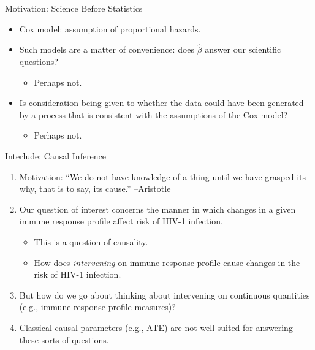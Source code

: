 \documentclass[12pt,t,handout]{beamer}
\begin{document}
\begin{frame}[c]{Motivation: Science Before Statistics}
\begin{center}
\begin{itemize}
  \itemsep10pt
  \item Cox model: assumption of proportional hazards.
  \item Such models are a matter of convenience: does $\hat{\beta}$ answer our
    scientific questions?
    \begin{itemize}
      \item Perhaps not.
    \end{itemize}
  \item Is consideration being given to whether the data could have been
    generated by a process that is consistent with the assumptions of the Cox
    model?
    \begin{itemize}
      \item Perhaps not.
    \end{itemize}
\end{itemize}
\end{center}

\note{
}
\end{frame}


\begin{frame}[c]{Interlude: Causal Inference}

\begin{center}
\begin{enumerate}
  \itemsep10pt
  \item Motivation: ``We do not have knowledge of a thing until we have grasped
    its why, that is to say, its cause.'' --Aristotle
  \item Our question of interest concerns the manner in which changes in a given
    immune response profile affect risk of HIV-1 infection.
    \begin{itemize}
      \item This is a question of causality.
      \item How does \textit{intervening} on immune response profile cause
        changes in the risk of HIV-1 infection.
    \end{itemize}
  \item But how do we go about thinking about intervening on continuous
    quantities (e.g., immune response profile measures)?
  \item Classical causal parameters (e.g., ATE) are not well suited for
    answering these sorts of questions.
\end{enumerate}
\end{center}

\note{
}

\end{frame}
\end{document}
